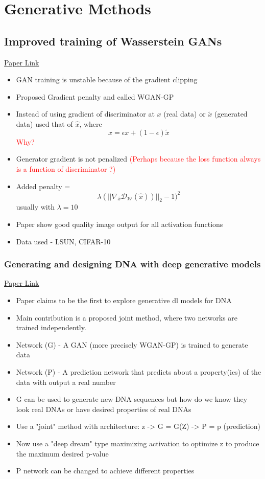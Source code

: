 \documentclass[11pt]{article}
\newcommand{\red}[1]{\textcolor{red}{#1}}
\newcommand{\xhat}{\hat{x}}
\begin{document}
    \section{Generative Methods}

    \subsection{Improved training of Wasserstein GANs}
    \href{https://arxiv.org/pdf/1704.00028.pdf}{Paper Link}
    \begin{itemize}
        \item GAN training is unstable because of the gradient clipping
        \item Proposed Gradient penalty and called WGAN-GP
        \item Instead of using gradient of discriminator at $x$ (real data) or $\tilde{x}$ (generated data) used that of $\xhat$, where $$\xhat = \epsilon x + (1-\epsilon) \tilde{x}$$ \red{Why?}
        \item Generator gradient is not penalized \red{(Perhaps because the loss function always is a function of discriminator ?)}
        \item Added penalty = $$\lambda (||\nabla_{\xhat} \mathcal{D_W} (\xhat))||_2 - 1)^2$$ usually with $\lambda=10$
        \item Paper show good quality image output for all activation functions
        \item Data used - LSUN, CIFAR-10
    \end{itemize}

    \subsubsection{Generating and designing DNA with deep generative models}
    \href{https://arxiv.org/pdf/1712.06148.pdf}{Paper Link}
    \begin{itemize}
        \item Paper claims to be the first to explore generative dl models for DNA
        \item Main contribution is a proposed joint method, where two networks are trained independently.
        \item Network (G) - A GAN (more precisely WGAN-GP) is trained to generate data
        \item Network (P) - A prediction network that predicts about a property(ies) of the data with output a real number
        \item G can be used to generate new DNA sequences but how do we know they look real DNAs or have desired properties of real DNAs
        \item Use a "joint" method with architecture: z -> G = G(Z) -> P = p (prediction)
        \item Now use a "deep dream" type maximizing activation to optimize z to produce the maximum desired p-value
        \item P network can be changed to achieve different properties
    \end{itemize}
\end{document}
